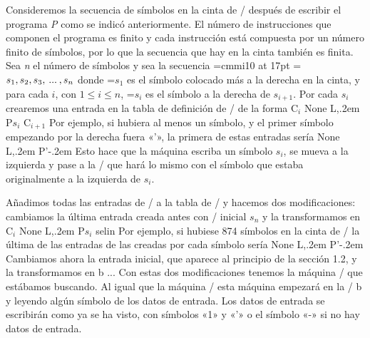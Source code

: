 Consideremos la secuencia de símbolos en la cinta de \E/ después de escribir el programa {\it P}
como se indicó anteriormente. El número de instrucciones que componen el programa es finito y cada
instrucción está compuesta por un número finito de símbolos, por lo que la secuencia que hay en la
cinta también es finita. Sea {\it n} el número de símbolos y sea la secuencia
\encaje
\font\mathlista=cmmi10 at 17pt
=\mathlista
$ s_1, s_2, s_3,\kern.2em ... \kern.2em, s_n $
\finencaje
donde {=\mathlista $ s_1 $} es el símbolo colocado más a la derecha en la cinta, y para
cada $ i $, con $ 1\le i \le n $, {=\mathlista $ s_i $ es el símbolo a la derecha de $
s_{i+1} $}. Por cada $ s_i $ crearemos una entrada en la tabla de definición de \machcoma/ de la
forma
\encaje
{\fcode C${}_{i}$\kern22pt None\kern22pt L,\kern.2em P$ s_i $\kern21pt C${}_{i+1}$}
\finencaje
Por ejemplo, si hubiera al menos un símbolo, y el primer símbolo empezando por la derecha fuera «’»,
la primera de estas entradas sería
\encaje
{    {\fcode None\hskip0.3in  L,\kern.2em P’\kern-.2em}    }
\finencaje
Esto hace que la máquina escriba un símbolo $ s_i $, se mueva a la izquierda y pase a la \configuration/ que
hará lo mismo con el símbolo que estaba originalmente a la izquierda de $ s_i $.

Añadimos todas las entradas de \E/ a la tabla de \machcoma/ y hacemos dos modificaciones: cambiamos
la última entrada creada antes con \configuration/ inicial $ s_n $ y la transformamos en
\encaje
{\fcode C${}_{i}$\kern22pt None\kern22pt L,\kern.2em P$ s_i $\kern21pt selin}
\finencaje
Por ejemplo, si hubiese 874 símbolos en la cinta de \E/ la última de las entradas de las creadas
por cada símbolo sería
\encaje
{    {\fcode None\hskip0.3in  L,\kern.2em P’\kern-.2em}    }
\finencaje
Cambiamos ahora la entrada inicial, que aparece al principio de la sección 1.2, y la transformamos en
\encaje
{\mconfig b}    {\fcode...}    {}
\finencaje
Con estas dos modificaciones tenemos la máquina \machcoma/ que estábamos buscando. Al igual que la
máquina \E/ esta máquina empezará en la \configuration/ {\ffraktur b} y leyendo algún símbolo de los
datos de entrada. Los datos de entrada se escribirán como ya se ha visto, con símbolos «1» y «'» o
el símbolo «-» si no hay datos de entrada.
